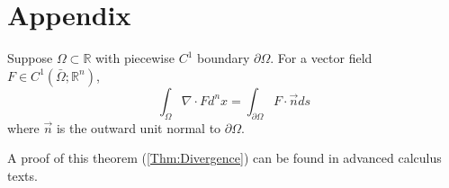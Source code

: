 
\appendix
\section{Appendix}

\begin{theorem}
Suppose $\Omega \subset \mathbb{R}$ with piecewise $C^1$ boundary $\partial \Omega$. For a vector field $F \in C^1(\bar \Omega; \mathbb{R}^n)$, 
\begin{equation}
    \int_\Omega \nabla \cdot F d^nx = \int_{\partial \Omega} F \cdot \vec{n} ds
\end{equation}
where $\vec{n} $ is the outward unit normal to $\partial \Omega$.
\label{Thm:Divergence}
\end{theorem}
A proof of this theorem (\ref{Thm:Divergence}) can be found in advanced calculus texts. 


\newpage